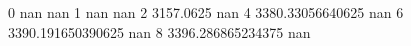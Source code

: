 0 nan nan
1 nan nan
2 3157.0625 nan
4 3380.33056640625 nan
6 3390.191650390625 nan
8 3396.286865234375 nan
